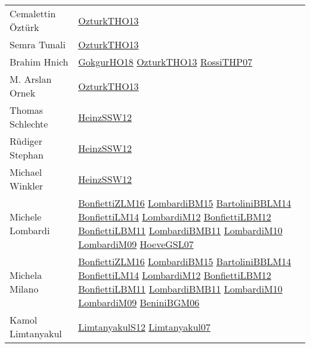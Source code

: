 {\begin{longtable}{p{4cm}p{15cm}}
Cemalettin {\"{O}}zt{\"{u}}rk & \href{articles/OzturkTHO13.pdf}{OzturkTHO13}\cite{OzturkTHO13} \\
Semra Tunali & \href{articles/OzturkTHO13.pdf}{OzturkTHO13}\cite{OzturkTHO13} \\
Brahim Hnich & \href{articles/GokgurHO18.pdf}{GokgurHO18}\cite{GokgurHO18} \href{articles/OzturkTHO13.pdf}{OzturkTHO13}\cite{OzturkTHO13} \href{papers/RossiTHP07.pdf}{RossiTHP07}\cite{RossiTHP07} \\
M. Arslan Ornek & \href{articles/OzturkTHO13.pdf}{OzturkTHO13}\cite{OzturkTHO13} \\
Thomas Schlechte & \href{articles/HeinzSSW12.pdf}{HeinzSSW12}\cite{HeinzSSW12} \\
R{\"{u}}diger Stephan & \href{articles/HeinzSSW12.pdf}{HeinzSSW12}\cite{HeinzSSW12} \\
Michael Winkler & \href{articles/HeinzSSW12.pdf}{HeinzSSW12}\cite{HeinzSSW12} \\
Michele Lombardi & \href{papers/BonfiettiZLM16.pdf}{BonfiettiZLM16}\cite{BonfiettiZLM16} \href{papers/LombardiBM15.pdf}{LombardiBM15}\cite{LombardiBM15} \href{papers/BartoliniBBLM14.pdf}{BartoliniBBLM14}\cite{BartoliniBBLM14} \href{papers/BonfiettiLM14.pdf}{BonfiettiLM14}\cite{BonfiettiLM14} \href{articles/LombardiM12.pdf}{LombardiM12}\cite{LombardiM12} \href{papers/BonfiettiLBM12.pdf}{BonfiettiLBM12}\cite{BonfiettiLBM12} \href{papers/BonfiettiLBM11.pdf}{BonfiettiLBM11}\cite{BonfiettiLBM11} \href{papers/LombardiBMB11.pdf}{LombardiBMB11}\cite{LombardiBMB11} \href{papers/LombardiM10.pdf}{LombardiM10}\cite{LombardiM10} \href{papers/LombardiM09.pdf}{LombardiM09}\cite{LombardiM09} \href{papers/HoeveGSL07.pdf}{HoeveGSL07}\cite{HoeveGSL07} \\
Michela Milano & \href{papers/BonfiettiZLM16.pdf}{BonfiettiZLM16}\cite{BonfiettiZLM16} \href{papers/LombardiBM15.pdf}{LombardiBM15}\cite{LombardiBM15} \href{papers/BartoliniBBLM14.pdf}{BartoliniBBLM14}\cite{BartoliniBBLM14} \href{papers/BonfiettiLM14.pdf}{BonfiettiLM14}\cite{BonfiettiLM14} \href{articles/LombardiM12.pdf}{LombardiM12}\cite{LombardiM12} \href{papers/BonfiettiLBM12.pdf}{BonfiettiLBM12}\cite{BonfiettiLBM12} \href{papers/BonfiettiLBM11.pdf}{BonfiettiLBM11}\cite{BonfiettiLBM11} \href{papers/LombardiBMB11.pdf}{LombardiBMB11}\cite{LombardiBMB11} \href{papers/LombardiM10.pdf}{LombardiM10}\cite{LombardiM10} \href{papers/LombardiM09.pdf}{LombardiM09}\cite{LombardiM09} \href{papers/BeniniBGM06.pdf}{BeniniBGM06}\cite{BeniniBGM06} \\
Kamol Limtanyakul & \href{articles/LimtanyakulS12.pdf}{LimtanyakulS12}\cite{LimtanyakulS12} \href{papers/Limtanyakul07.pdf}{Limtanyakul07}\cite{Limtanyakul07} \\

\end{longtable}}
